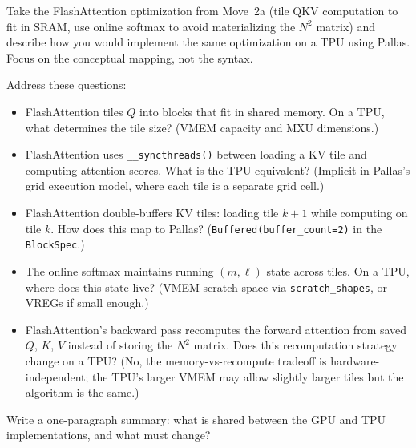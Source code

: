 \begin{exercise}
Take the FlashAttention optimization from Move~2a (tile QKV computation to fit in SRAM, use online softmax to avoid materializing the $N^2$ matrix) and describe how you would implement the same optimization on a TPU using Pallas. Focus on the conceptual mapping, not the syntax.

Address these questions:
\begin{itemize}
  \item FlashAttention tiles $Q$ into blocks that fit in shared memory. On a TPU, what determines the tile size? (VMEM capacity and MXU dimensions.)
  \item FlashAttention uses \texttt{\_\_syncthreads()} between loading a KV tile and computing attention scores. What is the TPU equivalent? (Implicit in Pallas's grid execution model, where each tile is a separate grid cell.)
  \item FlashAttention double-buffers KV tiles: loading tile $k+1$ while computing on tile $k$. How does this map to Pallas? (\texttt{Buffered(buffer\_count=2)} in the \texttt{BlockSpec}.)
  \item The online softmax maintains running $(m, \ell)$ state across tiles. On a TPU, where does this state live? (VMEM scratch space via \texttt{scratch\_shapes}, or VREGs if small enough.)
  \item FlashAttention's backward pass recomputes the forward attention from saved $Q$, $K$, $V$ instead of storing the $N^2$ matrix. Does this recomputation strategy change on a TPU? (No, the memory-vs-recompute tradeoff is hardware-independent; the TPU's larger VMEM may allow slightly larger tiles but the algorithm is the same.)
\end{itemize}

Write a one-paragraph summary: what is shared between the GPU and TPU implementations, and what must change?
\end{exercise}

\newpage
